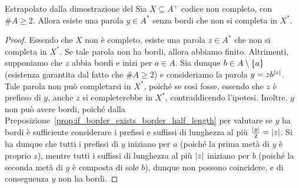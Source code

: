 \begin{lemma}[label=lem:code_not_complete_boredless_word]{\protect\infosymbol{} Estrapolato dalla dimostrazione del }
  Sia \(X \subseteq A^+\) codice non completo, con \(\# A \geq 2\).
  Allora esiste una parola \(y \in A^*\) senza bordi che non si completa in \(X^*\).
\end{lemma}
\begin{proof}
  Essendo che \(X\) non è completo, esiste una parola \(z \in A^*\) che non si completa in \(X^*\).
  Se tale parola non ha bordi, allora abbiamo finito.
  Altrimenti, supponiamo che \(z\) abbia bordi e inizi per \(a \in A\).
  Sia dunque \(b \in A\setminus\set{a}\) (esistenza garantita dal fatto che \(\# A \geq 2\)) e consideriamo la parola \(y = zb^{\left|z\right|}\).
  Tale parola non può completarsi in \(X^*\), poiché se così fosse, essendo che \(z\) è prefisso di \(y\), anche \(z\) si completerebbe in \(X^*\), contraddicendo l'ipotesi.
  Inoltre, \(y\) non può avere bordi, poiché dalla Preposizione~\ref{prop:if_border_exists_border_half_length} per valutare se \(y\) ha bordi è sufficiente considerare i prefissi e suffissi di lunghezza al più \(\frac{\left|y\right|}{2} = \left|z\right|\).
  Si ha dunque che tutti i prefissi di \(y\) iniziano per \(a\) (poiché la prima metà di \(y\) è proprio \(z\)), mentre tutti i suffissi di lunghezza al più \(\left|z\right|\) iniziano per \(b\) (poiché la seconda metà di \(y\) è composta di sole \(b\)), dunque non possono coincidere, e di conseguenza \(y\) non ha bordi.
\end{proof}

